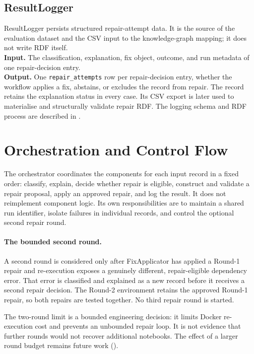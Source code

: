\subsection{ResultLogger}
\label{subsec:resultlogger}
ResultLogger persists structured repair-attempt data. It is the source of
the evaluation dataset and the CSV input to the knowledge-graph mapping; it
does not write RDF itself.\\
\textbf{Input.} The classification, explanation, fix object, outcome, and
run metadata of one repair-decision entry.\\
\textbf{Output.} One \texttt{repair\_attempts} row per repair-decision
entry, whether the workflow applies a fix, abstains, or excludes the record
from repair. The record retains the explanation status in every case. Its CSV
export is later used to materialise and structurally validate repair RDF.
The logging schema and RDF process are described in
.

\section{Orchestration and Control Flow}
\label{sec:orchestrator}

The orchestrator coordinates the components for each input record in a fixed
order: classify, explain, decide whether repair is eligible, construct and
validate a repair proposal, apply an approved repair, and log the result. It
does not reimplement component logic. Its own responsibilities are to maintain
a shared run identifier, isolate failures in individual records, and control
the optional second repair round.

\paragraph{The bounded second round.}
A second round is considered only after FixApplicator has applied a Round-1
repair and re-execution exposes a genuinely different, repair-eligible
dependency error. That error is classified and explained as a new record
before it receives a second repair decision. The Round-2 environment retains
the approved Round-1 repair, so both repairs are tested together. No third
repair round is started.

The two-round limit is a bounded engineering decision: it limits Docker
re-execution cost and prevents an unbounded repair loop. It is not evidence
that further rounds would not recover additional notebooks. The effect of a
larger round budget remains future work ().

